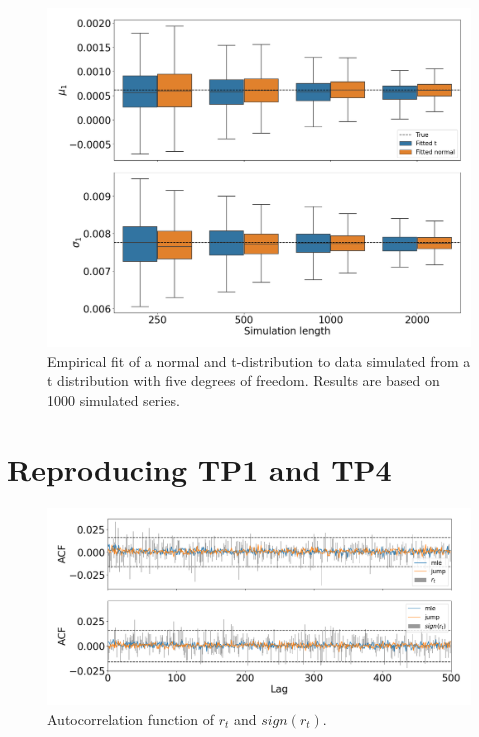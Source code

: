 \begin{figure}[H] 
    \centering
    \includegraphics[width=1\textwidth]{analysis/model_convergence/images/theoretical_fit_t_dist.png}
    \caption[Empirical fit of a normal and t-distribution to data simulated from a t-distribution with five degrees of freedom]{Empirical fit of a normal and t-distribution to data simulated from a t distribution with five degrees of freedom. Results are based on 1000 simulated series.}
    \label{fig:jump_theoretical_fit}
\end{figure}

\section{Reproducing TP1 and TP4}
\label{appendix:sign_rt}

\begin{figure}[H] 
    \centering
    \includegraphics[width=1.0\textwidth]{analysis/stylized_facts/images/acf_sign.png}
    \caption[Autocorrelation function of $r_t$ and $sign(r_t)$]{Autocorrelation function of $r_t$ and $sign(r_t)$.}
    \label{fig:stylized_facts_acf_sign_rt} 
\end{figure}

